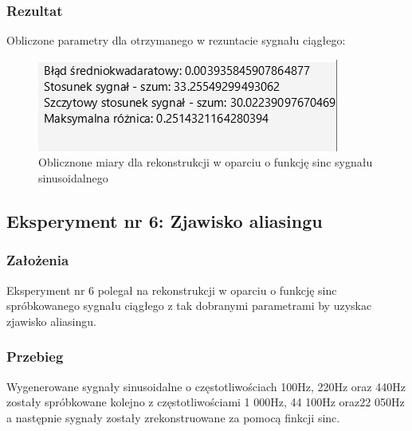 \documentclass[12pt]{article}
\begin{document}
\subsubsection{Rezultat}
Obliczone parametry dla otrzymanego w rezuntacie sygnału ciągłego:
\begin{figure}[H]
	\centering
	\includegraphics[width=\linewidth]{wyniki_sinc.jpg}
	\caption{Oblicznone miary dla rekonstrukcji w oparciu o funkcję sinc sygnału sinusoidalnego}
	\label{wartości dla eksperymentu 5}
\end{figure}

\newpage
\subsection{Eksperyment nr 6: Zjawisko aliasingu }
\subsubsection{Założenia}
Eksperyment nr 6 polegał na rekonstrukcji w oparciu o funkcję sinc spróbkowanego sygnału ciągłego z tak dobranymi parametrami by uzyskac zjawisko aliasingu.
\subsubsection{Przebieg}
Wygenerowane sygnały sinusoidalne o częstotliwościach 100Hz, 220Hz oraz 440Hz  zostały spróbkowane kolejno z częstotliwościami  1 000Hz, 44 100Hz oraz22 050Hz a następnie sygnały zostały zrekonstruowane za pomocą finkcji sinc.
\end{document}
